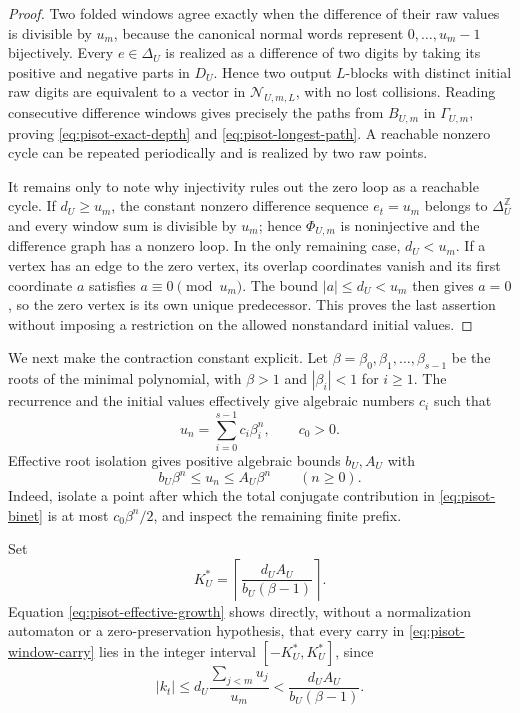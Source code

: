 \begin{proof}
Two folded windows agree exactly when the difference of their raw values is
divisible by $u_m$, because the canonical normal words represent
$0,\ldots,u_m-1$ bijectively.  Every $e\in\Delta_U$ is realized as a
difference of two digits by taking its positive and negative parts in
$D_U$.  Hence two output $L$-blocks with distinct initial raw digits are
equivalent to a vector in $\mathcal N_{U,m,L}$, with no lost collisions.
Reading consecutive difference windows gives precisely the paths from
$B_{U,m}$ in $\Gamma_{U,m}$, proving \eqref{eq:pisot-exact-depth} and
\eqref{eq:pisot-longest-path}.  A reachable nonzero cycle can be repeated
periodically and is realized by two raw points.

It remains only to note why injectivity rules out the zero loop as a
reachable cycle.  If $d_U\ge u_m$, the constant nonzero difference sequence
$e_t=u_m$ belongs to $\Delta_U^{\mathbb Z}$ and every window sum is divisible
by $u_m$; hence $\Phi_{U,m}$ is noninjective and the difference graph has a
nonzero loop.  In the only remaining case, $d_U<u_m$.  If a vertex has an
edge to the zero vertex, its overlap coordinates vanish and its first
coordinate $a$ satisfies $a\equiv0\pmod {u_m}$.  The bound $|a|\le d_U<u_m$
then gives $a=0$, so the zero vertex is its own unique predecessor.  This
proves the last assertion without imposing a restriction on the allowed
nonstandard initial values.
\end{proof}

We next make the contraction constant explicit.  Let
$\beta=\beta_0,\beta_1,\ldots,\beta_{s-1}$ be the roots of the minimal
polynomial, with $\beta>1$ and $|\beta_i|<1$ for $i\ge1$.  The recurrence and
the initial values effectively give algebraic numbers $c_i$ such that
\begin{equation}
u_n=\sum_{i=0}^{s-1}c_i\beta_i^n,
\qquad c_0>0.
\label{eq:pisot-binet}
\end{equation}
Effective root isolation gives positive algebraic bounds $b_U,A_U$ with
\begin{equation}
b_U\beta^n\le u_n\le A_U\beta^n\qquad(n\ge0).
\label{eq:pisot-effective-growth}
\end{equation}
Indeed, isolate a point after which the total conjugate contribution in
\eqref{eq:pisot-binet} is at most $c_0\beta^n/2$, and inspect the remaining
finite prefix.

Set
\begin{equation}
K_U^{*}=
\left\lceil\frac{d_UA_U}{b_U(\beta-1)}\right\rceil.
\label{eq:pisot-analytic-carry-bound}
\end{equation}
Equation \eqref{eq:pisot-effective-growth} shows directly, without a
normalization automaton or a zero-preservation hypothesis, that every carry
in \eqref{eq:pisot-window-carry} lies in the integer interval
$[-K_U^{*},K_U^{*}]$, since
\[
|k_t|\le d_U\frac{\sum_{j<m}u_j}{u_m}
<\frac{d_UA_U}{b_U(\beta-1)}.
\]

